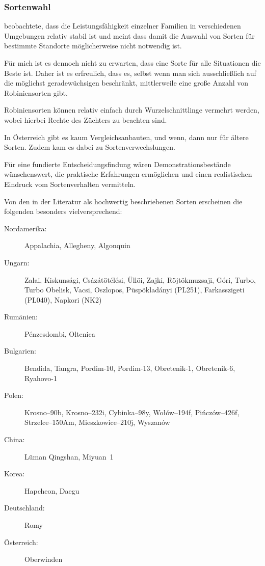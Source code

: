 \documentclass[twocolumn]{scrartcl}
\begin{document}
\subsubsection{Sortenwahl}

\citet{bloes1992robinie} beobachtete, dass die Leistungsfähigkeit
einzelner Familien in verschiedenen Umgebungen relativ stabil ist und
meint dass damit die Auswahl von Sorten für bestimmte Standorte
möglicherweise nicht notwendig ist.

Für mich ist es dennoch nicht zu erwarten, dass eine Sorte für alle
Situationen die Beste ist. Daher ist es erfreulich, dass es, selbst
wenn man sich ausschließlich auf die möglichst geradewüchsigen
beschränkt, mittlerweile eine große Anzahl von Robiniensorten gibt.

Robiniensorten können relativ einfach durch Wurzelschnittlinge
vermehrt werden, wobei hierbei Rechte des Züchters zu beachten sind.

In Österreich gibt es kaum Vergleichsanbauten, und wenn, dann nur für
ältere Sorten. Zudem kam es dabei zu Sortenverwechslungen.

Für eine fundierte Entscheidungsfindung wären Demonstrationsbestände
wünschenswert, die praktische Erfahrungen ermöglichen und einen
realistischen Eindruck vom Sortenverhalten vermitteln.

Von den in der Literatur als hochwertig beschriebenen Sorten
erscheinen die folgenden besonders vielversprechend:

\begin{description}
  \item[Nordamerika:] Appalachia, Allegheny, Algonquin
  \item[Ungarn:] Zalai, Kiskunsági, Csázátötélési, Üllöi, Zajki, Röjtökmuzsaji, Góri, Turbo, Turbo Obelisk, Vacsi, Oszlopos, Püspökladányi (PL251), Farkasszigeti (PL040), Napkori (NK2)
  \item[Rumänien:] Pénzesdombi, Oltenica
  \item[Bulgarien:] Bendida, Tangra, Pordim-10, Pordim-13, Obretenik-1, Obretenik-6, Ryahovo-1
  \item[Polen:] Krosno--90b, Krosno--232i, Cybinka--98y, Wołów--194f, Pińczów--426f, Strzelce--150Am, Mieszkowice--210j, Wyszanów
  \item[China:] Lüman Qingshan, Miyuan~1
  \item[Korea:] Hapcheon, Daegu
  \item[Deutschland:] Romy
  \item[Österreich:] Oberwinden
\end{description}
\end{document}
